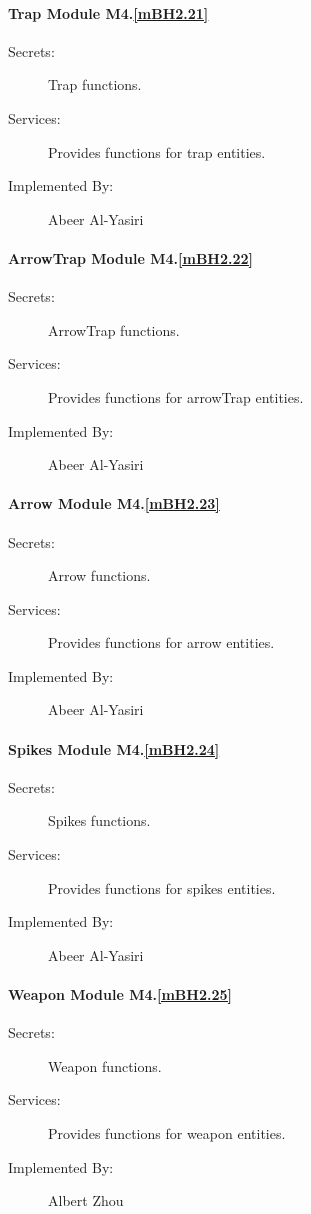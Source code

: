 \documentclass[12pt, titlepage]{article}
\begin{document}
{\paragraph{Trap Module M4.\ref{mBH2.21}}
\begin{description}
\item[Secrets:] Trap functions.
\item[Services:] Provides functions for trap entities. 
\item[Implemented By:] Abeer Al-Yasiri
\end{description}

\paragraph{ArrowTrap Module M4.\ref{mBH2.22}}
\begin{description}
\item[Secrets:] ArrowTrap functions.
\item[Services:] Provides functions for arrowTrap entities. 
\item[Implemented By:] Abeer Al-Yasiri
\end{description}

\paragraph{Arrow Module M4.\ref{mBH2.23}}
\begin{description}
\item[Secrets:] Arrow functions.
\item[Services:] Provides functions for arrow entities. 
\item[Implemented By:] Abeer Al-Yasiri
\end{description}

\paragraph{Spikes Module M4.\ref{mBH2.24}}
\begin{description}
\item[Secrets:] Spikes functions.
\item[Services:] Provides functions for spikes entities. 
\item[Implemented By:] Abeer Al-Yasiri
\end{description}

\paragraph{Weapon Module M4.\ref{mBH2.25}}
\begin{description}
\item[Secrets:] Weapon functions.
\item[Services:] Provides functions for weapon entities. 
\item[Implemented By:] Albert Zhou
\end{description}

}
\end{document}
